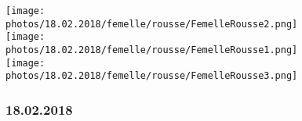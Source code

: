 \documentclass{article}%
\begin{document}
\begin{figure}[h!]%
\centering%
\texttt{[image: photos/18.02.2018/femelle/rousse/FemelleRousse2.png]}%
\hspace{0.5cm}%
\vspace{0.2cm}%
\centering%
\texttt{[image: photos/18.02.2018/femelle/rousse/FemelleRousse1.png]}%
\hspace{0.5cm}%
\vspace{0.2cm}%
\newline%
\centering%
\texttt{[image: photos/18.02.2018/femelle/rousse/FemelleRousse3.png]}%
\hspace{0.5cm}%
\vspace{0.2cm}%
\subsubsection{18.02.2018}%

%
\end{figure}

%
\clearpage

%
\end{document}
